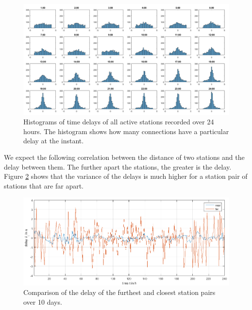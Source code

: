 \documentclass[12pt,a4paper,english]{article}
\begin{document}
\begin{figure}[ht]
  \begin{center}   
   \includegraphics[width=\textwidth]{hourlydelaydistributionoverallstationsforoneday.png}
  \end{center}
  \caption{Histograms of time delays of all active stations recorded over 24 hours. The histogram shows how many connections have a particular delay at the instant.}\label{fig:histograms}
\end{figure}


We expect the following correlation between the distance of two stations and the delay between them. The further apart the stations, the greater is the delay. Figure \ref{fig:nearfar} shows that the variance of the delays is much higher for a station pair of stations that are far apart.

\begin{figure}[ht]
  \begin{center}   
   \includegraphics[width=\textwidth]{Comparisondelayoverrandomdayoffarestandclosestlinks.png}
  \end{center}
  \caption{Comparison of the delay of the furthest and closest station pairs over 10 days.}\label{fig:nearfar}
\end{figure}
\end{document}
